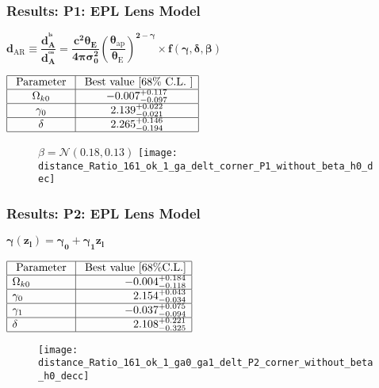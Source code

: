 \documentclass[10pt,xcolor={dvipsnames}]{beamer}
\begin{document}
\begin{frame}
 \frametitle{Results: \textbf{ P1: EPL} Lens Model}
\begin{scriptsize}
$
{\boxed{\boldsymbol{d_{\mathrm{AR}} \equiv \dfrac{d_{A}^{^{ls}}}{d_{A}^{^{os}}}=\dfrac{c^{2} \theta_{E}}{4 \pi \sigma_{0}^{2}}\left(\dfrac{\theta_{\mathrm{ap}}}{\theta_{\mathrm{E}}}\right)^{2-\gamma} \times f(\gamma, \delta, \beta)}}}
$
\end{scriptsize} {\scriptsize $\begin{array}{|c|c|}\hline \text { Parameter } & {\text { Best value }[68 \% \text { C.L. }]} \\ \hline \Omega_{k 0} & {-0.007^{+0.117}_{-0.097}} \\ \hline \gamma_{0} & {2.139^{+0.022}_{-0.021}} \\ \hline \delta & {2.265^{+0.146}_{-0.194}} \\ \hline\end{array}$}
\begin{figure}[ht!]
$\beta=\mathcal{N}\left(0.18,0.13\right)$
\centering
\texttt{[image: distance\_Ratio\_161\_ok\_1\_ga\_delt\_corner\_P1\_without\_beta\_h0\_dec]}
\end{figure} 
\end{frame}
\begin{frame}
 \frametitle{Results: \textbf{ P2: EPL} Lens Model}
\begin{large}

$
{\boxed{\boldsymbol{\gamma(z_l)=\gamma_0+\gamma_1 z_l}}}
$
\end{large}\hspace*{1cm}$\begin{array}{|l|r|}\hline \text { Parameter } & {\text { Best value }[68 \% \mathrm{C.L.}]} \\ \hline \Omega_{k 0} & {-0.004^{+0.184}_{-0.118}} \\ \hline \gamma_{0} & {2.154^{+0.043}_{-0.034}} \\ \hline \gamma_{1} & {-0.037^{+0.075}_{-0.094}} \\ \hline \delta & {2.108^{+0.221}_{-0.325}} \\ \hline\end{array}$
\begin{figure}[ht!]
\centering
\texttt{[image: distance\_Ratio\_161\_ok\_1\_ga0\_ga1\_delt\_P2\_corner\_without\_beta\_h0\_decc]}
\end{figure} 
\end{frame}
\end{document}
